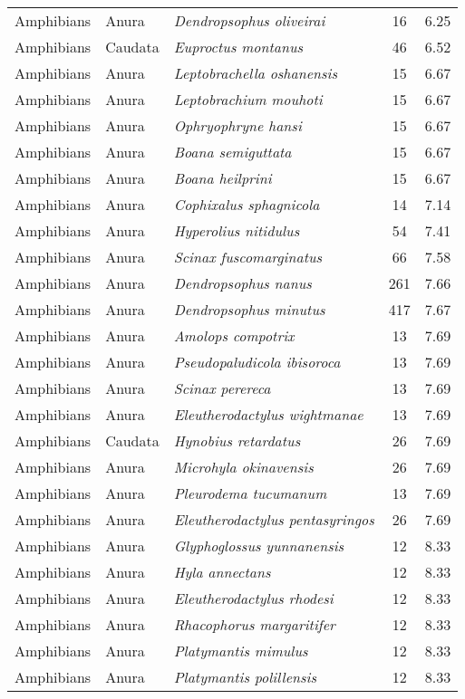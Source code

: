 \begin{longtable}{ll>{\itshape}lcc}
  Amphibians & Anura & Dendropsophus oliveirai &  16 & 6.25 \\ 
  Amphibians & Caudata & Euproctus montanus &  46 & 6.52 \\ 
  Amphibians & Anura & Leptobrachella oshanensis &  15 & 6.67 \\ 
  Amphibians & Anura & Leptobrachium mouhoti &  15 & 6.67 \\ 
  Amphibians & Anura & Ophryophryne hansi &  15 & 6.67 \\ 
  Amphibians & Anura & Boana semiguttata &  15 & 6.67 \\ 
  Amphibians & Anura & Boana heilprini &  15 & 6.67 \\ 
  Amphibians & Anura & Cophixalus sphagnicola &  14 & 7.14 \\ 
  Amphibians & Anura & Hyperolius nitidulus &  54 & 7.41 \\ 
  Amphibians & Anura & Scinax fuscomarginatus &  66 & 7.58 \\ 
  Amphibians & Anura & Dendropsophus nanus & 261 & 7.66 \\ 
  Amphibians & Anura & Dendropsophus minutus & 417 & 7.67 \\ 
  Amphibians & Anura & Amolops compotrix &  13 & 7.69 \\ 
  Amphibians & Anura & Pseudopaludicola ibisoroca &  13 & 7.69 \\ 
  Amphibians & Anura & Scinax perereca &  13 & 7.69 \\ 
  Amphibians & Anura & Eleutherodactylus wightmanae &  13 & 7.69 \\ 
  Amphibians & Caudata & Hynobius retardatus &  26 & 7.69 \\ 
  Amphibians & Anura & Microhyla okinavensis &  26 & 7.69 \\ 
  Amphibians & Anura & Pleurodema tucumanum &  13 & 7.69 \\ 
  Amphibians & Anura & Eleutherodactylus pentasyringos &  26 & 7.69 \\ 
  Amphibians & Anura & Glyphoglossus yunnanensis &  12 & 8.33 \\ 
  Amphibians & Anura & Hyla annectans &  12 & 8.33 \\ 
  Amphibians & Anura & Eleutherodactylus rhodesi &  12 & 8.33 \\ 
  Amphibians & Anura & Rhacophorus margaritifer &  12 & 8.33 \\ 
  Amphibians & Anura & Platymantis mimulus &  12 & 8.33 \\ 
  Amphibians & Anura & Platymantis polillensis &  12 & 8.33 \\ 

\end{longtable}
